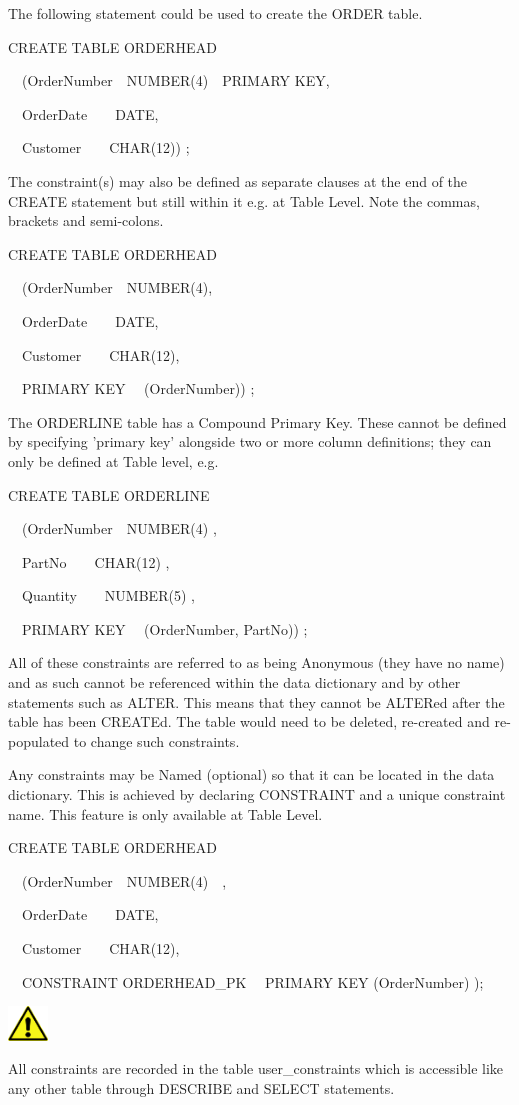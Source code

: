 The following statement could be used to create the ORDER table.

CREATE TABLE ORDERHEAD

\ \ (OrderNumber\ \ NUMBER(4)\ \ PRIMARY KEY,

\ \  OrderDate\ \ \ \ DATE,

\ \  Customer\ \ \ \ CHAR(12)) ;

The constraint(s) may also be defined as separate clauses at the end of the CREATE statement but still within it e.g. at Table Level.  Note the commas, brackets and semi-colons.

CREATE TABLE ORDERHEAD

\ \ (OrderNumber\ \ NUMBER(4),

\ \  OrderDate\ \ \ \ DATE,

\ \  Customer\ \ \ \ CHAR(12),

\ \  PRIMARY KEY \ \ (OrderNumber)) ;

The ORDERLINE table has a Compound Primary Key.  These cannot be defined by specifying 'primary key' alongside two or more column definitions; they can only be defined at Table level, e.g.

CREATE TABLE ORDERLINE

\ \ (OrderNumber\ \ NUMBER(4) ,

\ \  PartNo\ \ \ \ CHAR(12) ,

\ \  Quantity\ \ \ \ NUMBER(5) ,

\ \  PRIMARY KEY \ \ (OrderNumber, PartNo)) ;

All of these constraints are referred to as being Anonymous (they have no name) and as such cannot be referenced within the data dictionary and by other statements such as ALTER.  This means that they cannot be ALTERed after the table has been CREATEd.  The table would need to be deleted, re-created and re-populated to change such constraints. 

Any constraints may be Named (optional) so that it can be located in the data dictionary.  This is achieved by declaring CONSTRAINT and a unique constraint name.  This feature is only available at Table Level.

CREATE TABLE ORDERHEAD

\ \ (OrderNumber\ \ NUMBER(4)\ \ ,

\ \  OrderDate\ \ \ \ DATE,

\ \  Customer\ \ \ \ CHAR(12),

\ \  CONSTRAINT ORDERHEAD\_PK \ \ PRIMARY KEY (OrderNumber) );


\begin{center}
  
\includegraphics[width=1.076cm,height=0.917cm]{images/img (2).png}

\end{center}
All constraints are recorded in the table user\_constraints which is accessible like any other table through DESCRIBE and SELECT statements.

